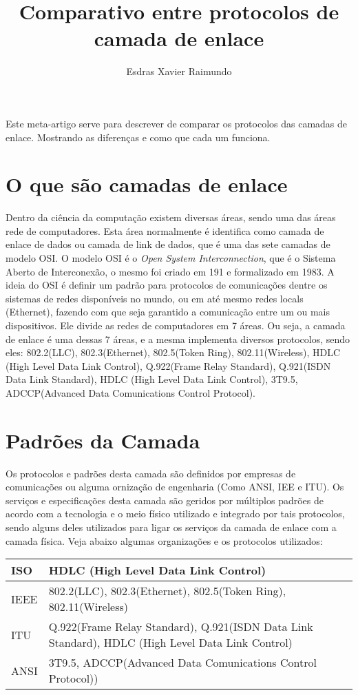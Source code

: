 \documentclass[12pt]{article}
\title{Comparativo entre protocolos de camada de enlace}
\author{Esdras Xavier Raimundo\inst{1} }
\begin{document}
\maketitle

\begin{resumo} 
  Este meta-artigo serve para descrever de comparar os protocolos das camadas de enlace. Mostrando as diferenças e como que cada um funciona.
\end{resumo}

\pagebreak
\section{O que são camadas de enlace} \label{sec:firstpage}
Dentro da ciência da computação existem diversas áreas, sendo uma das áreas rede de computadores. Esta área normalmente é identifica como camada de enlace de dados ou camada de link de dados, que é uma das sete camadas de modelo OSI. O modelo OSI é o \textit{Open System Interconnection}, que é o Sistema Aberto de Interconexão, o mesmo foi criado em 191 e formalizado em 1983. A ideia do OSI é definir um padrão para protocolos de comunicações dentre os sistemas de redes disponíveis no mundo, ou em até mesmo redes locals (Ethernet), fazendo com que seja garantido a comunicação entre um ou mais dispositivos. Ele divide as redes de computadores em 7 áreas. Ou seja, a camada de enlace é uma dessas 7 áreas, e a mesma implementa diversos protocolos, sendo eles: 802.2(LLC), 802.3(Ethernet), 802.5(Token Ring), 802.11(Wireless), HDLC (High Level Data Link Control), Q.922(Frame Relay Standard), Q.921(ISDN Data Link Standard), HDLC (High Level Data Link Control), 3T9.5, ADCCP(Advanced Data Comunications Control Protocol).


\section{Padrões da Camada}
Os protocolos e padrões desta camada são definidos por empresas de comunicações ou alguma ornização de engenharia (Como ANSI, IEE e ITU). Os serviços e especificações desta camada são geridos por múltiplos padrões de acordo com a tecnologia e o meio físico utilizado e integrado por tais protocolos, sendo alguns deles utilizados para ligar os serviços da camada de enlace com a camada física. Veja abaixo algumas organizações e os protocolos utilizados:

\begin{center}
\begin{tabular}{ |p{1cm}|p{9cm}|  }
\hline
 ISO & HDLC (High Level Data Link Control) \\
 \hline
 IEEE & 802.2(LLC), 802.3(Ethernet), 802.5(Token Ring), 802.11(Wireless) \\
 \hline
 ITU & Q.922(Frame Relay Standard), Q.921(ISDN Data Link Standard), HDLC (High Level Data Link Control) \\
 \hline
 ANSI & 3T9.5, ADCCP(Advanced Data Comunications Control Protocol)) \\ 
 \hline
\end{tabular}
\end{center}
\end{document}
